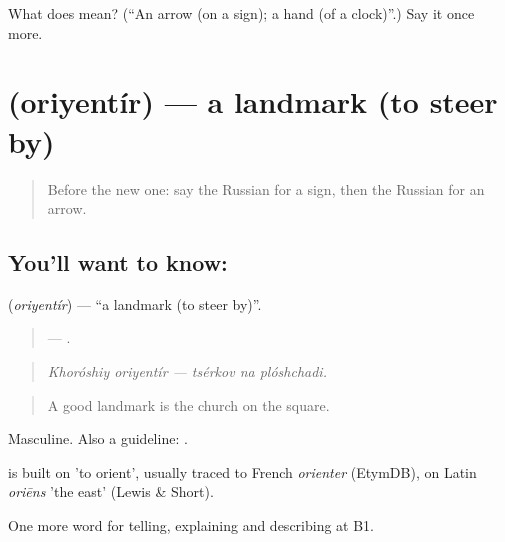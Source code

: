 \begin{tcolorbox}[breakable,colback=teal!4,colframe=teal!35!black,title={Before you move on}]
What does  mean? (\textquotedblleft{}An arrow (on a sign); a hand (of a clock)\textquotedblright{}.) Say it once more.
\end{tcolorbox}
\section[\texorpdfstring{\ru{ориентир} (oriyentír)}{ориентир (oriyentír)}]{ (oriyentír) — a landmark (to steer by)}

\label{lesson:RU-C438-oriyentir}



\begin{quote}
Before the new one: say the Russian for a sign, then the Russian for an arrow.
\end{quote}

\subsection*{You'll want to know: }
\textbf{} (\emph{oriyentír}) — \textquotedblleft{}a landmark (to steer by)\textquotedblright{}.

\begin{quote}
  —   .
\end{quote}

\begin{quote}
\emph{Khoróshiy oriyentír — tsérkov na plóshchadi.}
\end{quote}

\begin{quote}
A good landmark is the church on the square.
\end{quote}

Masculine. Also a guideline: \emph{  }.

\begin{cousinweb}
\emph{} is built on \emph{} 'to orient', usually traced to French \emph{orienter} (EtymDB), on Latin \emph{oriēns} 'the east' (Lewis \& Short).
\end{cousinweb}

\begin{grammarlens}[title={What you've built}]
One more word for telling, explaining and describing at B1.
\end{grammarlens}

